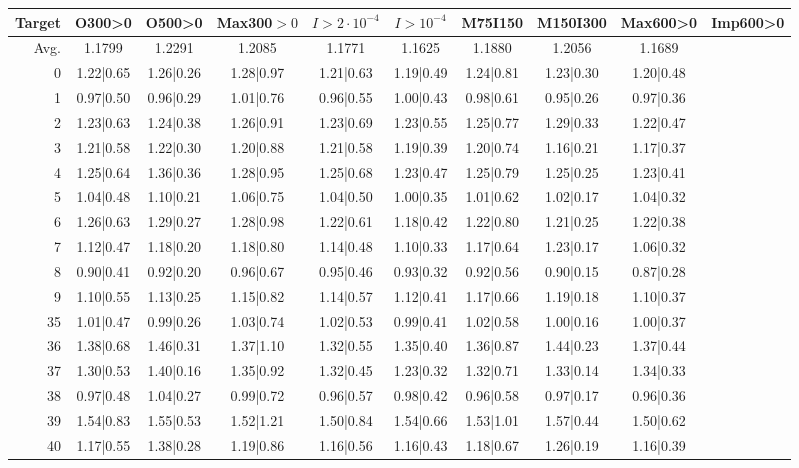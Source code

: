 \begin{table}
	\begin{tabular}{|r||c|c|c|c|c|c|c|c|c|}
\hline
Target & O300>0  &O500>0   & Max300$>0$ & $I>2\cdot10^{-4}$ & $I>10^{-4}$ & M75I150 & M150I300 & Max600>0 & Imp600>0  \\\hline
\hline
Avg. & 1.1799 & 1.2291 & 1.2085 & 1.1771 & 1.1625 & 1.1880 & 1.2056 & 1.1689 &  \\\hline
0 &1.22|0.65 &1.26|0.26 &1.28|0.97 &1.21|0.63 &1.19|0.49 &1.24|0.81 &1.23|0.30 &1.20|0.48 &  \\\hline
1 &0.97|0.50 &0.96|0.29 &1.01|0.76 &0.96|0.55 &1.00|0.43 &0.98|0.61 &0.95|0.26 &0.97|0.36 &  \\\hline
2 &1.23|0.63 &1.24|0.38 &1.26|0.91 &1.23|0.69 &1.23|0.55 &1.25|0.77 &1.29|0.33 &1.22|0.47 &  \\\hline
3 &1.21|0.58 &1.22|0.30 &1.20|0.88 &1.21|0.58 &1.19|0.39 &1.20|0.74 &1.16|0.21 &1.17|0.37 &  \\\hline
4 &1.25|0.64 &1.36|0.36 &1.28|0.95 &1.25|0.68 &1.23|0.47 &1.25|0.79 &1.25|0.25 &1.23|0.41 &  \\\hline
5 &1.04|0.48 &1.10|0.21 &1.06|0.75 &1.04|0.50 &1.00|0.35 &1.01|0.62 &1.02|0.17 &1.04|0.32 &  \\\hline
6 &1.26|0.63 &1.29|0.27 &1.28|0.98 &1.22|0.61 &1.18|0.42 &1.22|0.80 &1.21|0.25 &1.22|0.38 &  \\\hline
7 &1.12|0.47 &1.18|0.20 &1.18|0.80 &1.14|0.48 &1.10|0.33 &1.17|0.64 &1.23|0.17 &1.06|0.32 &  \\\hline
8 &0.90|0.41 &0.92|0.20 &0.96|0.67 &0.95|0.46 &0.93|0.32 &0.92|0.56 &0.90|0.15 &0.87|0.28 &  \\\hline
9 &1.10|0.55 &1.13|0.25 &1.15|0.82 &1.14|0.57 &1.12|0.41 &1.17|0.66 &1.19|0.18 &1.10|0.37 &  \\\hline
35 &1.01|0.47 &0.99|0.26 &1.03|0.74 &1.02|0.53 &0.99|0.41 &1.02|0.58 &1.00|0.16 &1.00|0.37 &  \\\hline
36 &1.38|0.68 &1.46|0.31 &1.37|1.10 &1.32|0.55 &1.35|0.40 &1.36|0.87 &1.44|0.23 &1.37|0.44 &  \\\hline
37 &1.30|0.53 &1.40|0.16 &1.35|0.92 &1.32|0.45 &1.23|0.32 &1.32|0.71 &1.33|0.14 &1.34|0.33 &  \\\hline
38 &0.97|0.48 &1.04|0.27 &0.99|0.72 &0.96|0.57 &0.98|0.42 &0.96|0.58 &0.97|0.17 &0.96|0.36 &  \\\hline
39 &1.54|0.83 &1.55|0.53 &1.52|1.21 &1.50|0.84 &1.54|0.66 &1.53|1.01 &1.57|0.44 &1.50|0.62 &  \\\hline
40 &1.17|0.55 &1.38|0.28 &1.19|0.86 &1.16|0.56 &1.16|0.43 &1.18|0.67 &1.26|0.19 &1.16|0.39 &  \\\hline

\end{tabular}
\end{table}

